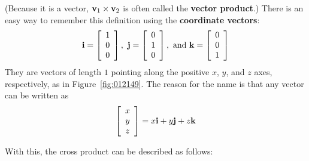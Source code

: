 \noindent (Because it is a vector, $\textbf{v}_{1} \times \textbf{v}_{2}$ is often called the \textbf{vector product}.) There is an easy way to remember this definition using the \textbf{coordinate vectors}:
\begin{equation*}
\textbf{i}= \left[
\begin{array}{c}
1\\
0 \\
0
\end{array}
\right], \
\textbf{j}= \left[
\begin{array}{c}
0\\
1 \\
0
\end{array}
\right],
\mbox{ and }
\textbf{k}= \left[
\begin{array}{c}
0\\
0 \\
1
\end{array}
\right]
\end{equation*}
They are vectors of length $1$ pointing along the positive $x$, $y$, and $z$ axes, respectively, as in Figure~\ref{fig:012149}. The reason for the name is that any vector can be written as
\begin{equation*}
\left[
\begin{array}{c}
x\\
y \\
z
\end{array}
\right]
= x\textbf{i} + y\textbf{j} + z\textbf{k}
\end{equation*}

With this, the cross product can be described as follows:


